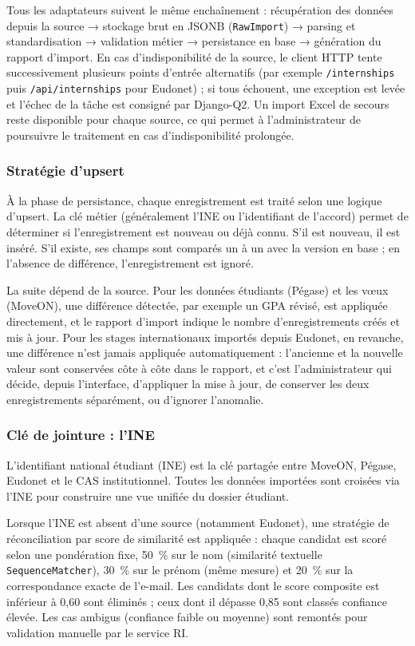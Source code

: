 Tous les adaptateurs suivent le même enchaînement : récupération des données depuis la source → stockage brut en JSONB (\texttt{RawImport}) → parsing et standardisation → validation métier → persistance en base → génération du rapport d'import. En cas d'indisponibilité de la source, le client HTTP tente successivement plusieurs points d'entrée alternatifs (par exemple \texttt{/internships} puis \texttt{/api/internships} pour Eudonet) ; si tous échouent, une exception est levée et l'échec de la tâche est consigné par Django-Q2. Un import Excel de secours reste disponible pour chaque source, ce qui permet à l'administrateur de poursuivre le traitement en cas d'indisponibilité prolongée.

\subsubsection{Stratégie d'upsert}

À la phase de persistance, chaque enregistrement est traité selon une logique d'upsert. La clé métier (généralement l'INE ou l'identifiant de l'accord) permet de déterminer si l'enregistrement est nouveau ou déjà connu. S'il est nouveau, il est inséré. S'il existe, ses champs sont comparés un à un avec la version en base ; en l'absence de différence, l'enregistrement est ignoré.

La suite dépend de la source. Pour les données étudiants (Pégase) et les vœux (MoveON), une différence détectée, par exemple un GPA révisé, est appliquée directement, et le rapport d'import indique le nombre d'enregistrements créés et mis à jour. Pour les stages internationaux importés depuis Eudonet, en revanche, une différence n'est jamais appliquée automatiquement : l'ancienne et la nouvelle valeur sont conservées côte à côte dans le rapport, et c'est l'administrateur qui décide, depuis l'interface, d'appliquer la mise à jour, de conserver les deux enregistrements séparément, ou d'ignorer l'anomalie.

\subsubsection{Clé de jointure : l'INE}

L'identifiant national étudiant (INE) est la clé partagée entre
MoveON, Pégase, Eudonet et le CAS institutionnel. Toutes les données
importées sont croisées via l'INE pour construire une vue unifiée
du dossier étudiant.

Lorsque l'INE est absent d'une source (notamment Eudonet),
une stratégie de réconciliation par score de similarité est appliquée :
chaque candidat est scoré selon une pondération fixe, 50~\% sur le nom
(similarité textuelle \texttt{SequenceMatcher}), 30~\% sur le prénom
(même mesure) et 20~\% sur la correspondance exacte de l'e-mail.
Les candidats dont le score composite est inférieur à 0,60 sont
éliminés ; ceux dont il dépasse 0,85 sont classés confiance élevée.
Les cas ambigus (confiance faible ou moyenne) sont remontés pour
validation manuelle par le service RI.

